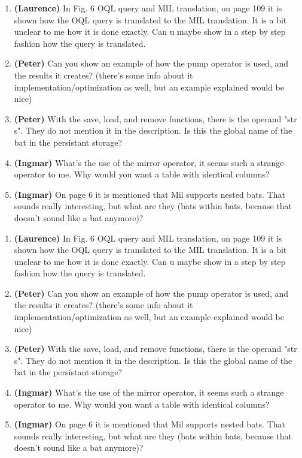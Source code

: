 \documentclass{article}
\begin{document}
\newpage

\begin{enumerate}

\item {\bf (Laurence)} In Fig. 6 OQL query and MIL translation, on page 109 it is shown how the 
OQL query is translated to the MIL translation. It is a bit unclear to 
me how it is done exactly. Can u maybe show in a step by step fashion 
how the query is translated.

\item {\bf (Peter)} Can you show an example of how the pump operator is used, and the 
results it creates? (there's some info about it 
implementation/optimization as well, but an example explained would be 
nice)

\item {\bf (Peter)} With the save, load, and remove functions, there is the operand "str 
s". They do not mention it in the description. Is this the global name 
of the bat in the persistant storage?

\item {\bf (Ingmar)} What's the use of the mirror operator, it seems such a strange
operator to me. Why would you want a table with identical columns?

\item {\bf (Ingmar)} On page 6 it is mentioned that Mil supports nested bats. That
sounds really interesting, but what are they (bats within bats,
because that doesn't sound like a bat anymore)?

\end{enumerate}

\newpage

\begin{enumerate}

\item {\bf (Laurence)} In Fig. 6 OQL query and MIL translation, on page 109 it is shown how the 
OQL query is translated to the MIL translation. It is a bit unclear to 
me how it is done exactly. Can u maybe show in a step by step fashion 
how the query is translated.

\item {\bf (Peter)} Can you show an example of how the pump operator is used, and the 
results it creates? (there's some info about it 
implementation/optimization as well, but an example explained would be 
nice)

\item {\bf (Peter)} With the save, load, and remove functions, there is the operand "str 
s". They do not mention it in the description. Is this the global name 
of the bat in the persistant storage?

\item {\bf (Ingmar)} What's the use of the mirror operator, it seems such a strange
operator to me. Why would you want a table with identical columns?

\item {\bf (Ingmar)} On page 6 it is mentioned that Mil supports nested bats. That
sounds really interesting, but what are they (bats within bats,
because that doesn't sound like a bat anymore)?

\end{enumerate}
\end{document}
